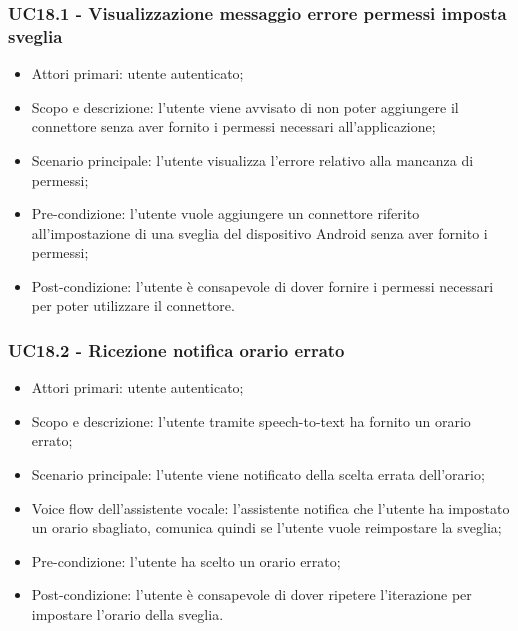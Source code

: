 \subsubsection{UC18.1 - Visualizzazione messaggio errore permessi imposta sveglia}
\begin{itemize}
	\item  Attori primari: utente autenticato;
	\item  Scopo e descrizione: l'utente viene avvisato di non poter aggiungere il connettore senza aver fornito i permessi necessari all'applicazione;
	\item  Scenario principale: l'utente visualizza l'errore relativo alla mancanza di permessi;
	\item  Pre-condizione: l'utente vuole aggiungere un connettore riferito all'impostazione di una sveglia del dispositivo Android senza aver fornito i permessi;
	\item  Post-condizione: l'utente è consapevole di dover fornire i permessi necessari per poter utilizzare il connettore.
\end{itemize}
\subsubsection{UC18.2 - Ricezione notifica orario errato}
\begin{itemize}
	\item  Attori primari: utente autenticato;
	\item  Scopo e descrizione: l'utente tramite speech-to-text ha fornito un orario errato;
	\item  Scenario principale: l'utente viene notificato della scelta errata dell'orario;
	\item  Voice flow dell'assistente vocale: l'assistente notifica che l'utente ha impostato un orario sbagliato, comunica quindi se l'utente vuole reimpostare la sveglia;
	\item  Pre-condizione: l'utente ha scelto un orario errato;
	\item  Post-condizione: l'utente è consapevole di dover ripetere l'iterazione per impostare l'orario della sveglia.
\end{itemize}
